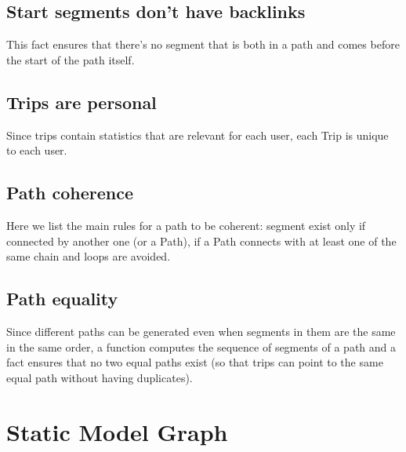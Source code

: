 \subsection{Start segments don't have backlinks}

This fact ensures that there's no segment that is both in a path and comes before the start of the path itself.

\subsection{Trips are personal}

Since trips contain statistics that are relevant for each user, each Trip is unique to each user.


\subsection{Path coherence}

Here we list the main rules for a path to be coherent: segment exist only if connected by another one (or a Path), if a Path connects with at least one of the same chain and loops are avoided.

\subsection{Path equality}

Since different paths can be generated even when segments in them are the same in the same order, a function computes the sequence of segments of a path and a fact ensures that no two equal paths exist (so that trips can point to the same equal path without having duplicates).

\section{Static Model Graph}
